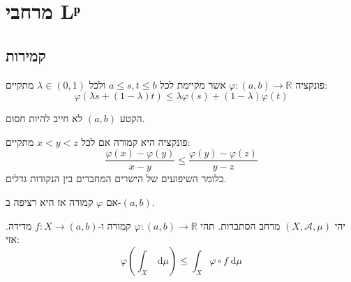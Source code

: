 \documentclass{tstextbook}
\begin{document}
\chapter{מרחבי Lᵖ}

\section{קמירות}

\begin{definition}
פונקציה \(\varphi:(a,b)\to \mathbb{R}\) אשר מקיימת לכל \(a\leq s,t \leq b\) ולכל \(\lambda \in (0,1)\) מתקיים:
$$\varphi\left( \lambda s+\left( 1-\lambda \right)t \right)\leq \lambda \varphi(s)+\left( 1-\lambda \right)\varphi(t)$$

\end{definition}
\begin{remark}
הקטע \((a,b)\) לא חייב להיות חסום.

\end{remark}
\begin{proposition}
פונקציה היא קמורה אם לכל \(x<y<z\) מתקיים:
$$\frac{\varphi(x)-\varphi(y)}{x-y}\leq \frac{\varphi(y)-\varphi(z)}{y-z}$$
כלומר השיפועים של הישרים המחברים בין הנקודות גדלים.

\end{proposition}
\begin{lemma}
אם \(\varphi\) קמורה אז היא רציפה ב-\((a,b)\).

\end{lemma}
\begin{theorem}
יהי \(\left( X,\mathcal{A},\mu \right)\) מרחב הסתברות. תהי \(\varphi:(a,b)\to \mathbb{R}\) קמורה ו-\(f:X\to (a,b)\) מדידה. אזי:
$$\varphi\left( \int _{X} \;\mathrm{d} \mu  \right)\leq \int _{X} \varphi \circ  f \;\mathrm{d} \mu $$

\end{theorem}
\end{document}
